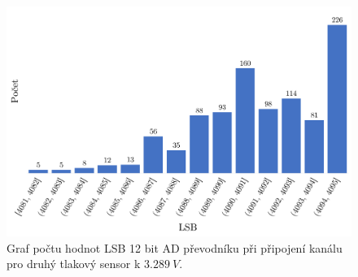 \begin{figure}[H]
    \caption{Graf počtu hodnot LSB 12 bit AD převodníku při připojení kanálu pro druhý tlakový sensor k $3.289 \ V$.}
    \label{fig:hist_vacuum2_3_3}
    \includegraphics[width=1\textwidth]{graphs/vacuum2_33.png}


\end{figure}